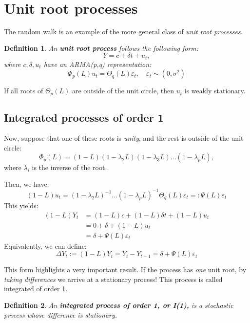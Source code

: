 \documentclass[11pt, a4paper]{report}
\theoremstyle{plain}
\theoremstyle{plain}
\newtheorem{defn}{Definition}[section]
\theoremstyle{remark}
\begin{document}
\section{Unit root processes}

The random walk is an example of the more general class of \textit{unit root processes.}

\begin{defn}
	An \textbf{unit root process} follows the following form:
	$$ Y = c + \delta t + u_t,$$
	where $c, \delta, u_t$ have an ARMA(p,q) representation:
	$$\Phi_p (L) u_t = \Theta_{q} (L) \varepsilon_{t}, \hspace{1em} \varepsilon_{t} \sim (0, \sigma^2) $$
\end{defn}

If all roots of $\Theta_p (L)$ are outside of the unit circle, then $u_t$ is weakly stationary. 

\subsection{Integrated processes of order 1}

Now, suppose that one of these roots is \textit{unity}, and the rest is outside of the unit circle:
$$\Phi_{p}(L)=(1-L)\left(1-\lambda_{2} L\right)\left(1-\lambda_{3} L\right) \ldots\left(1-\lambda_{p} L\right),$$
where $\lambda_i$ is the inverse of the root.

Then, we have: 
$$
(1-L) u_{t}=\left(1-\lambda_{2} L\right)^{-1} \ldots\left(1-\lambda_{p} L\right)^{-1} \Theta_{q}(L) \varepsilon_{t}=: \Psi(L) \varepsilon_{t}
$$
This yields:
$$
\begin{aligned}
	(1-L) Y_{t} &=(1-L) c+(1-L) \delta t+(1-L) u_{t} \\
	&=0+\delta+(1-L) u_{t} \\
	&=\delta+\Psi(L) \varepsilon_{t}
\end{aligned}
$$
Equivalently, we can define:
$$
\Delta Y_{t}:=(1-L) Y_{t}=Y_{t}-Y_{t-1}=\delta+\Psi(L) \varepsilon_{t}
$$

This form highlights a very important result. If the process has \textit{one} unit root, by \textit{taking differences} we arrive at a stationary process! This process is called integrated of order 1.

\begin{defn}
	An \textbf{integrated process of order 1, or I(1),} is a stochastic process whose difference is stationary.
\end{defn}
\end{document}
